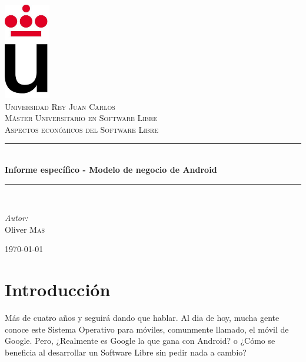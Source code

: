 \documentclass[11pt]{article}
\newcommand{\HRule}{\rule{\linewidth}{0.5mm}}
\begin{document}
\begin{titlepage}

\begin{center}


\includegraphics[width=0.15\textwidth]{./logo}\\[1cm]    

\textsc{\LARGE Universidad Rey Juan Carlos}\\[1.5cm]
\textsc{\Large Máster Universitario en Software Libre}\\[0.2cm]
\textsc{Aspectos económicos del Software Libre}\\[0.2cm]

\HRule \\[0.4cm]
{ \huge \bfseries Informe específico - Modelo de negocio de Android}\\[0.4cm]
\HRule \\[1.5cm]

\begin{minipage}{1\textwidth}
\begin{flushleft} \large
\emph{Autor:}\\
Oliver \textsc{Mas}
\end{flushleft}
\end{minipage}

\vfill

{\large \today}

\end{center}

\end{titlepage}



\tableofcontents
\newpage


\section{Introducción}
Más de cuatro años y seguirá dando que hablar. Al dia de hoy, mucha gente conoce este Sistema Operativo para móviles, comunmente llamado, el móvil de Google. Pero, ¿Realmente es Google la que gana con Android? o ¿Cómo se beneficia al desarrollar un Software Libre sin pedir nada a cambio?
\end{document}
